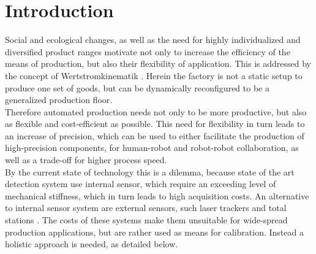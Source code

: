 \documentclass[5p,times,procedia]{elsarticle}
\begin{document}
\section{Introduction}
%
Social and ecological changes, as well as the need for
highly individualized and diversified product ranges
motivate not only to increase the efficiency of the means
of production, but also their flexibility of application.
This is addressed by the concept of Wertstromkinematik \cite{Muehlbeier2020}.
Herein the factory is not a static setup to produce
one set of goods, but can be dynamically reconfigured to be a generalized production floor.\\
Therefore automated production needs not only to
be more productive, but also as flexible and cost-efficient as possible. This need for flexibility in turn leads to an increase of precision, which can be used to either facilitate the production of high-precision components, for human-robot and robot-robot collaboration, as well as a trade-off for higher process speed.\\
By the current state of technology this is a dilemma, because state of the art detection system use internal sensor, which require an exceeding level of mechanical stiffness, which in turn leads to high
acquisition costs. An alternative to internal sensor system are external sensors, such laser trackers and total stations \cite{Moeller17, Yang17}. The costs of these systems make them unsuitable for wide-spread production applications, but are rather used as means for calibration. Instead a holistic approach is needed, as detailed below.
%
\end{document}
